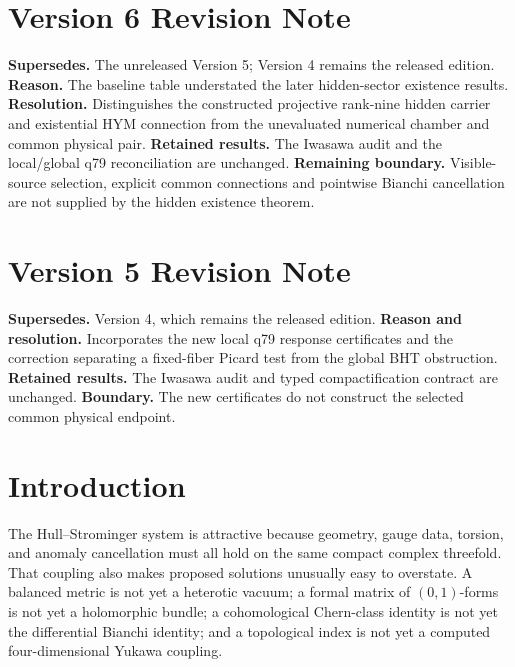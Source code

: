 \documentclass[11pt]{article}
\theoremstyle{definition}
\theoremstyle{remark}
\begin{document}
\section*{Version 6 Revision Note}
\noindent\textbf{Supersedes.} The unreleased Version 5; Version 4 remains
the released edition. \textbf{Reason.} The baseline table understated the
later hidden-sector existence results. \textbf{Resolution.} Distinguishes
the constructed projective rank-nine hidden carrier and existential HYM
connection from the unevaluated numerical chamber and common physical pair.
\textbf{Retained results.} The Iwasawa audit and the local/global q79
reconciliation are unchanged. \textbf{Remaining boundary.} Visible-source
selection, explicit common connections and pointwise Bianchi cancellation
are not supplied by the hidden existence theorem.

\section*{Version 5 Revision Note}
\noindent\textbf{Supersedes.} Version 4, which remains the released edition.
\textbf{Reason and resolution.} Incorporates the new local q79 response
certificates and the correction separating a fixed-fiber Picard test from
the global BHT obstruction. \textbf{Retained results.} The Iwasawa audit and
typed compactification contract are unchanged. \textbf{Boundary.} The new
certificates do not construct the selected common physical endpoint.

\tableofcontents

\section{Introduction}

The Hull--Strominger system is attractive because geometry, gauge data,
torsion, and anomaly cancellation must all hold on the same compact complex
threefold.  That coupling also makes proposed solutions unusually easy to
overstate.  A balanced metric is not yet a heterotic vacuum; a formal matrix
of \((0,1)\)-forms is not yet a holomorphic bundle; a cohomological Chern-class
identity is not yet the differential Bianchi identity; and a topological
index is not yet a computed four-dimensional Yukawa coupling.
\end{document}
